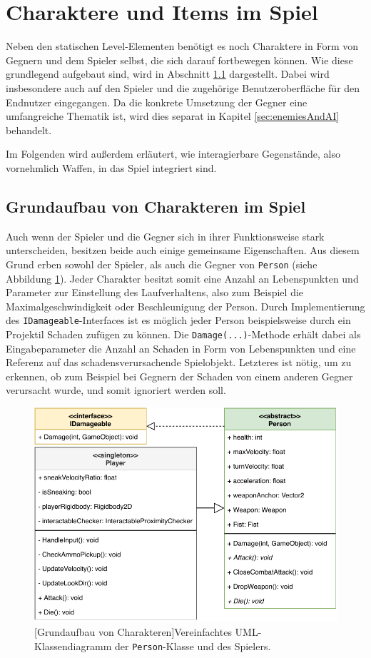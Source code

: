 \section{Charaktere und Items im Spiel}\label{sec:charactersAndItems}
Neben den statischen Level-Elementen benötigt es noch Charaktere in Form von Gegnern und dem Spieler selbst, die sich darauf fortbewegen können. Wie diese grundlegend aufgebaut sind, wird in Abschnitt \ref{sec:charactersBasic} dargestellt. Dabei wird insbesondere auch auf den Spieler und die zugehörige Benutzeroberfläche für den Endnutzer eingegangen. Da die konkrete Umsetzung der Gegner eine umfangreiche Thematik ist, wird dies separat in Kapitel \ref{sec:enemiesAndAI} behandelt.

Im Folgenden wird außerdem erläutert, wie interagierbare Gegenstände, also vornehmlich Waffen, in das Spiel integriert sind.

\subsection{Grundaufbau von Charakteren im Spiel}\label{sec:charactersBasic}
Auch wenn der Spieler und die Gegner sich in ihrer Funktionsweise stark unterscheiden, besitzen beide auch einige gemeinsame Eigenschaften. Aus diesem Grund erben sowohl der Spieler, als auch die Gegner von \texttt{Person} (siehe Abbildung \ref{fig:person_structure}). Jeder Charakter besitzt somit eine Anzahl an Lebenspunkten und Parameter zur Einstellung des Laufverhaltens, also zum Beispiel die Maximalgeschwindigkeit oder Beschleunigung der Person. Durch Implementierung des \texttt{IDamageable}-Interfaces ist es möglich jeder Person beispielsweise durch ein Projektil Schaden zufügen zu können. Die \texttt{Damage(...)}-Methode erhält dabei als Eingabeparameter die Anzahl an Schaden in Form von Lebenspunkten und eine Referenz auf das schadensverursachende Spielobjekt. Letzteres ist nötig, um zu erkennen, ob zum Beispiel bei Gegnern der Schaden von einem anderen Gegner verursacht wurde, und somit ignoriert werden soll.

\begin{figure}[h]
 \centering
 \includegraphics[width=0.8\linewidth]{diagrams/characters_reduced_UML.pdf}
 [Grundaufbau von Charakteren]{Vereinfachtes UML-Klassendiagramm der \texttt{Person}-Klasse und des Spielers}.
	\label{fig:person_structure}
\end{figure}

